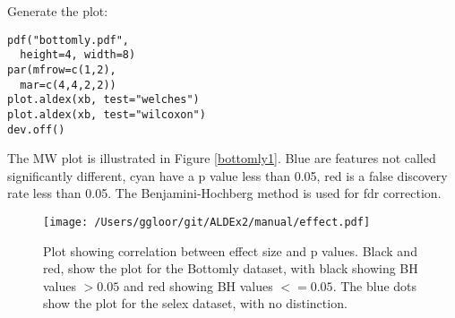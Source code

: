 \documentclass[11pt]{article}
\begin{document}
Generate the plot:
\begin{verbatim}
pdf("bottomly.pdf", 
  height=4, width=8)
par(mfrow=c(1,2), 
  mar=c(4,4,2,2))
plot.aldex(xb, test="welches")
plot.aldex(xb, test="wilcoxon")
dev.off()
\end{verbatim}

The MW plot is illustrated in Figure \ref{bottomly1}. Blue are features not called significantly different, cyan have a p value less than 0.05, red is a false discovery rate less than 0.05. The Benjamini-Hochberg method is used for fdr correction\cite{benjamini:1995}.

\begin{wrapfigure}{R}[0mm]{0.4\textwidth}
\vspace{0cm}
\begin{center}
\texttt{[image: /Users/ggloor/git/ALDEx2/manual/effect.pdf]}
\caption{Plot showing correlation between effect size and p values. Black and red, show the plot for the Bottomly dataset, with black showing BH values $>0.05$ and red showing BH values $<= 0.05$. The blue dots show the plot for the selex dataset, with no distinction.}
\label{effect}
\end{center}\vspace{0cm}
\end{wrapfigure}
\end{document}
